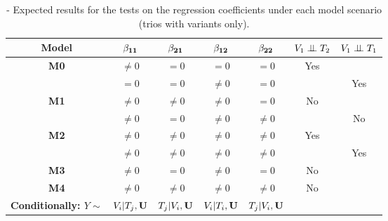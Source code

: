 \documentclass[12pt]{report}
\begin{document}
\begin{table}[H]
\centering
\caption{- Expected results for the tests on the regression coefficients under each model scenario (trios with variants only).}
\begin{tabular}{|c||cccc|c|c|}
\hline
\bf Model  & $\bf\beta_{11}$  &  $\bf\beta_{21}$   & $\bf\beta_{12}$    & $\bf\beta_{22}$    & $ V_1 \perp \!\!\! \perp T_2$    & $V_1 \perp \!\!\! \perp T_1$    \\ \hline \hline
\bf M0      &  $\neq 0$            & $= 0$                  & $=0$                    & $=0$                    & Yes                          &           \\ \hline 
               &  $= 0$                & $= 0$                  & $\neq 0$                & $= 0$                  &                                & Yes           \\ \hline
\bf M1      &  $\neq 0$            &  $\neq 0$             & $\neq0$                & $= 0$                 & No                            &            \\ \hline
               &  $\neq 0$            &  $= 0$                 & $\neq0$                & $\neq 0$              &                                & No       \\ \hline
\bf M2      &   $\neq0$            &  $\neq 0$             & $\neq0$                & $\neq0$               & Yes                          &           \\ \hline
               &   $\neq0$            &  $\neq 0$             & $\neq0$                & $\neq0$               &                                & Yes          \\ \hline
\bf M3      &   $\neq 0$           &  $= 0$                 & $\neq0$                & $=0$                   & No                           &            \\ \hline
\bf M4      &   $\neq0$            &  $\neq 0$             & $\neq0$                & $\neq0$               & No                          &             \\ \hline \hline
\bf Conditionally:  $Y \sim$& $V_i|T_j,{\bf U}$  &  $T_j|V_i, {\bf U}$   & $V_i| T_i, {\bf U}$    & $T_j|V_i,{\bf U}$    &            \\ \hline 
\end{tabular}
\end{table}
\end{document}
